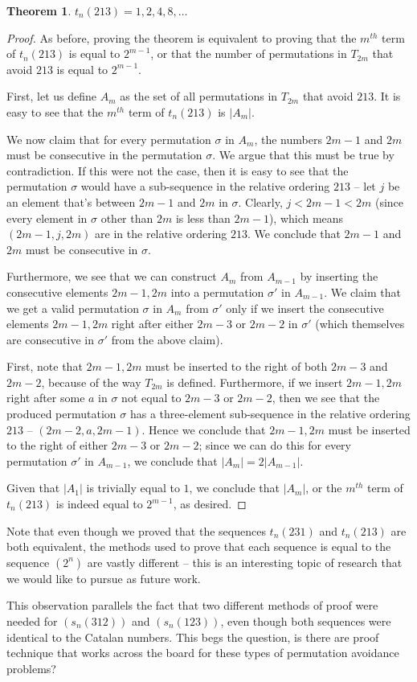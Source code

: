 \documentclass[11pt,letterpaper,twoside,english]{article}
\theoremstyle{theorem}
\newtheorem{theorem}{Theorem}
\theoremstyle{remark}
\begin{document}
\begin{theorem}
$t_n(213) = 1, 2, 4, 8, \ldots$
\end{theorem}

\begin{proof}
As before, proving the theorem is equivalent to proving that the $m^{th}$ term of $t_n(213)$ is equal to $2^{m-1}$, or that the number of permutations in $T_{2m}$ that avoid $213$ is equal to $2^{m-1}$.

First, let us define $A_m$ as the set of all permutations in $T_{2m}$ that avoid $213$. It is easy to see that the $m^{th}$ term of $t_n(213)$ is $|A_m|$.

We now claim that for every permutation $\sigma$ in $A_m$, the numbers $2m-1$ and $2m$ must be consecutive in the permutation $\sigma$. We argue that this must be true by contradiction. If this were not the case, then it is easy to see that the permutation $\sigma$ would have a sub-sequence in the relative ordering $213$ -- let $j$ be an element that's between $2m-1$ and $2m$ in $\sigma$. Clearly, $j < 2m -1 < 2m$ (since every element in $\sigma$ other than $2m$ is less than $2m-1$), which means $(2m - 1, j, 2m)$ are in the relative ordering $213$. We conclude that $2m-1$ and $2m$ must be consecutive in $\sigma$.

Furthermore, we see that we can construct $A_m$ from $A_{m-1}$ by inserting the consecutive elements $2m-1, 2m$ into a permutation $\sigma'$ in $A_{m-1}$. We claim that we get a valid permutation $\sigma$ in $A_m$ from $\sigma'$ only if we insert the consecutive elements $2m-1, 2m$ right after either $2m-3$ or $2m-2$ in $\sigma'$ (which themselves are consecutive in $\sigma'$ from the above claim).

First, note that $2m-1, 2m$ must be inserted to the right of both $2m-3$ and $2m-2$, because of the way $T_{2m}$ is defined. Furthermore, if we insert $2m-1, 2m$ right after some $a$ in $\sigma$ not equal to $2m-3$ or $2m-2$, then we see that the produced permutation $\sigma$ has a three-element sub-sequence in the relative ordering $213$ -- $(2m-2, a, 2m-1)$. Hence we conclude that $2m-1, 2m$ must be inserted to the right of either $2m-3$ or $2m-2$; since we can do this for every permutation $\sigma'$ in $A_{m-1}$, we conclude that $|A_m| = 2|A_{m-1}|$.

Given that $|A_1|$ is trivially equal to $1$, we conclude that $|A_m|$, or the $m^{th}$ term of $t_n(213)$ is indeed equal to $2^{m-1}$, as desired.
\end{proof}

Note that even though we proved that the sequences $t_n(231)$ and $t_n(213)$ are both equivalent, the methods used to prove that each sequence is equal to the sequence $(2^n)$ are vastly different -- this is an interesting topic of research that we would like to pursue as future work.

This observation parallels the fact that two different methods of proof were needed for $(s_n(312))$ and $(s_n(123))$, even though both sequences were identical to the Catalan numbers. This begs the question, is there are proof technique that works across the board for these types of permutation avoidance problems? 
\end{document}
